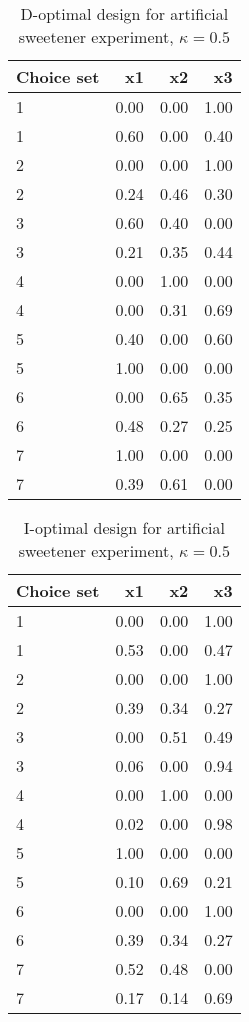\begin{table}[ht]
\centering
\begin{tabular}{lrrr}
  \hline
Choice set & x1 & x2 & x3 \\ 
  \hline
1 & 0.00 & 0.00 & 1.00 \\ 
  1 & 0.60 & 0.00 & 0.40 \\ 
  2 & 0.00 & 0.00 & 1.00 \\ 
  2 & 0.24 & 0.46 & 0.30 \\ 
  3 & 0.60 & 0.40 & 0.00 \\ 
  3 & 0.21 & 0.35 & 0.44 \\ 
  4 & 0.00 & 1.00 & 0.00 \\ 
  4 & 0.00 & 0.31 & 0.69 \\ 
  5 & 0.40 & 0.00 & 0.60 \\ 
  5 & 1.00 & 0.00 & 0.00 \\ 
  6 & 0.00 & 0.65 & 0.35 \\ 
  6 & 0.48 & 0.27 & 0.25 \\ 
  7 & 1.00 & 0.00 & 0.00 \\ 
  7 & 0.39 & 0.61 & 0.00 \\ 
   \hline
\end{tabular}
\caption{D-optimal design for artificial sweetener experiment, $\kappa = 0.5$} 
\label{tab:cornell_exp_d_optimal_des_kappa_0.5}
\end{table}
\begin{table}[ht]
\centering
\begin{tabular}{lrrr}
  \hline
Choice set & x1 & x2 & x3 \\ 
  \hline
1 & 0.00 & 0.00 & 1.00 \\ 
  1 & 0.53 & 0.00 & 0.47 \\ 
  2 & 0.00 & 0.00 & 1.00 \\ 
  2 & 0.39 & 0.34 & 0.27 \\ 
  3 & 0.00 & 0.51 & 0.49 \\ 
  3 & 0.06 & 0.00 & 0.94 \\ 
  4 & 0.00 & 1.00 & 0.00 \\ 
  4 & 0.02 & 0.00 & 0.98 \\ 
  5 & 1.00 & 0.00 & 0.00 \\ 
  5 & 0.10 & 0.69 & 0.21 \\ 
  6 & 0.00 & 0.00 & 1.00 \\ 
  6 & 0.39 & 0.34 & 0.27 \\ 
  7 & 0.52 & 0.48 & 0.00 \\ 
  7 & 0.17 & 0.14 & 0.69 \\ 
   \hline
\end{tabular}
\caption{I-optimal design for artificial sweetener experiment, $\kappa = 0.5$} 
\label{tab:cornell_exp_i_optimal_des_kappa_0.5}
\end{table}
